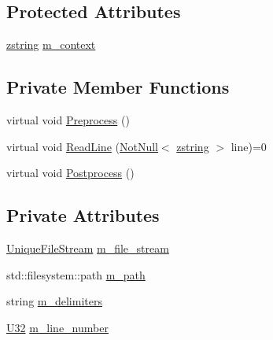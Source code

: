 \subsection*{Protected Attributes}
\begin{DoxyCompactItemize}
\item 
\mbox{\hyperlink{namespacemage_a4163ec9a9a27d5e7f4b452dcb99cb2b9}{zstring}} \mbox{\hyperlink{classmage_1_1_line_reader_ae1f715152d14188cc490870e307099d8}{m\+\_\+context}}
\end{DoxyCompactItemize}
\subsection*{Private Member Functions}
\begin{DoxyCompactItemize}
\item 
virtual void \mbox{\hyperlink{classmage_1_1_line_reader_a4de135cfb0434be786cfcfd7959031ef}{Preprocess}} ()
\item 
virtual void \mbox{\hyperlink{classmage_1_1_line_reader_ae50ac0637eddead37a7a9cca2a570072}{Read\+Line}} (\mbox{\hyperlink{namespacemage_a8769f9d670d6b585ea306cb1062af94b}{Not\+Null}}$<$ \mbox{\hyperlink{namespacemage_a4163ec9a9a27d5e7f4b452dcb99cb2b9}{zstring}} $>$ line)=0
\item 
virtual void \mbox{\hyperlink{classmage_1_1_line_reader_adfde21013140a1058d3dd567204abfb5}{Postprocess}} ()
\end{DoxyCompactItemize}
\subsection*{Private Attributes}
\begin{DoxyCompactItemize}
\item 
\mbox{\hyperlink{namespacemage_a0ee1bd45ad7dbb3dc8c8e1770e3538d4}{Unique\+File\+Stream}} \mbox{\hyperlink{classmage_1_1_line_reader_a510ff5355c6d26d7c29dc692ef18a3e2}{m\+\_\+file\+\_\+stream}}
\item 
std\+::filesystem\+::path \mbox{\hyperlink{classmage_1_1_line_reader_a05436c40af16b882c2ebd515287598f7}{m\+\_\+path}}
\item 
string \mbox{\hyperlink{classmage_1_1_line_reader_a6de3398ac59fdd98f8c40cff6f5c1075}{m\+\_\+delimiters}}
\item 
\mbox{\hyperlink{namespacemage_a41c104c036fba3756a74e19f793eeaa1}{U32}} \mbox{\hyperlink{classmage_1_1_line_reader_ab145590a7e115106c0987905fde98393}{m\+\_\+line\+\_\+number}}
\end{DoxyCompactItemize}


